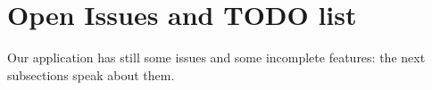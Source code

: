 \section{Open Issues and TODO list}
Our application has still some issues and some incomplete features: the next subsections speak about them.